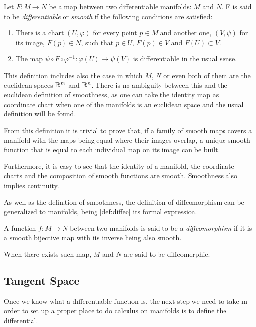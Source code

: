 \begin{definition}
	Let $F \colon M \to N$ be a map between two differentiable manifolds: $M$ and $N$. F is said to be \emph{differentiable} or \emph{smooth} if the following conditions are satisfied:
	\begin{enumerate}
		\item There is a chart $(U, \varphi)$ for every point $p \in M$ and another one, $(V, \psi)$ for its image, $F(p) \in N$, such that $p \in U$, $F(p) \in V$ and $F(U) \subset V$.
		\item The map $\psi \circ F \circ \varphi^{-1} : \varphi(U) \to \psi(V)$ is differentiable in the usual sense.
	\end{enumerate}
\end{definition}

This definition includes also the case in which $M$, $N$ or even both of them are the euclidean spaces $\mathbb{R}^m$ and $\mathbb{R}^n$. There is no ambiguity between this and the euclidean definition of smoothness, as one can take the identity map as coordinate chart when one of the manifolds is an euclidean space and the usual definition will be found.

From this definition it is trivial to prove that, if a family of smooth maps covers a manifold with the maps being equal where their images overlap, a unique smooth function that is equal to each individual map on its image can be built.

Furthermore, it is easy to see that the identity of a manifold, the coordinate charts and the composition of smooth functions are smooth. Smoothness also implies continuity.

As well as the definition of smoothness, the definition of diffeomorphism can be generalized to manifolds, being \autoref{def:diffeo} its formal expression.

\begin{definition}[Diffeomorphism]
	\label{def:diffeo}
	A function $f \colon M \to N$ between two manifolds is said to be a \emph{diffeomorphism} if it is a smooth bijective map with its inverse being also smooth.
	
	When there exists such map, $M$ and $N$ are said to be diffeomorphic.
\end{definition}

\subsection{Tangent Space}

Once we know what a differentiable function is, the next step we need to take in order to set up a proper place to do calculus on manifolds is to define the differential.

